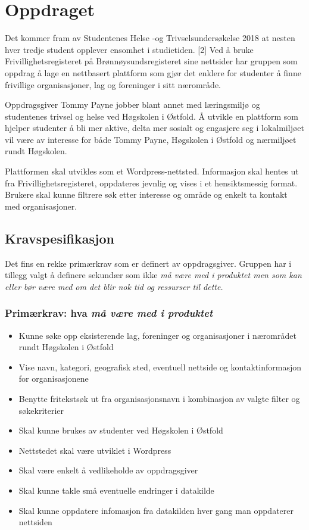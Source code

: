 \documentclass[11pt,a4paper]{report}
\begin{document}
\section*{Oppdraget}

Det kommer fram av Studentenes Helse -og Trivselsundersøkelse 2018 at nesten hver tredje student opplever ensomhet i studietiden. [2] Ved å bruke Frivillighetsregisteret på Brønnøysundsregisteret sine nettsider har gruppen som oppdrag å lage en nettbasert plattform som gjør det enklere for studenter å finne frivillige organisasjoner, lag og foreninger i sitt nærområde.

Oppdragsgiver Tommy Payne jobber blant annet med læringsmiljø og studentenes trivsel og helse ved Høgskolen i Østfold. Å utvikle en plattform som hjelper studenter å bli mer aktive, delta mer sosialt og engasjere seg i lokalmiljøet vil være av interesse for både Tommy Payne, Høgskolen i Østfold og nærmiljøet rundt Høgskolen.

Plattformen skal utvikles som et Wordpress-nettsted. Informasjon skal hentes ut fra Frivillighetsregisteret, oppdateres jevnlig og vises i et hensiktsmessig format. Brukere skal kunne filtrere søk etter interesse og område og enkelt ta kontakt med organisasjoner.

\subsection*{Kravspesifikasjon}
Det fins en rekke primærkrav som er definert av oppdragsgiver. Gruppen har i tillegg valgt å definere sekundær som ikke \em må \em være med i produktet men som \em kan \em eller \em bør \em være med om det blir nok tid og ressurser til dette.

\subsubsection{Primærkrav: hva \em må \em være med i produktet}
\begin{itemize}
\item Kunne søke opp eksisterende lag, foreninger og organisasjoner i nærområdet rundt Høgskolen i Østfold
\item Vise navn, kategori, geografisk sted, eventuell nettside og kontaktinformasjon for organisasjonene
\item Benytte fritekstsøk ut fra organisasjonsnavn i kombinasjon av valgte filter og søkekriterier
\item Skal kunne brukes av studenter ved Høgskolen i Østfold
\item Nettstedet skal være utviklet i Wordpress
\item Skal være enkelt å vedlikeholde av oppdragsgiver
\item Skal kunne takle små eventuelle endringer i datakilde
\item Skal kunne oppdatere infomasjon fra datakilden hver gang man oppdaterer nettsiden
\end{itemize}
\end{document}
